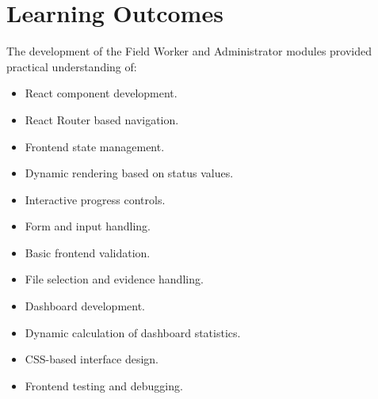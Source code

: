 \documentclass[12pt,a4paper]{article}
\begin{document}
\section{Learning Outcomes}

The development of the Field Worker and Administrator modules provided
practical understanding of:

\begin{itemize}
    \item React component development.
    \item React Router based navigation.
    \item Frontend state management.
    \item Dynamic rendering based on status values.
    \item Interactive progress controls.
    \item Form and input handling.
    \item Basic frontend validation.
    \item File selection and evidence handling.
    \item Dashboard development.
    \item Dynamic calculation of dashboard statistics.
    \item CSS-based interface design.
    \item Frontend testing and debugging.
\end{itemize}


\end{document}
